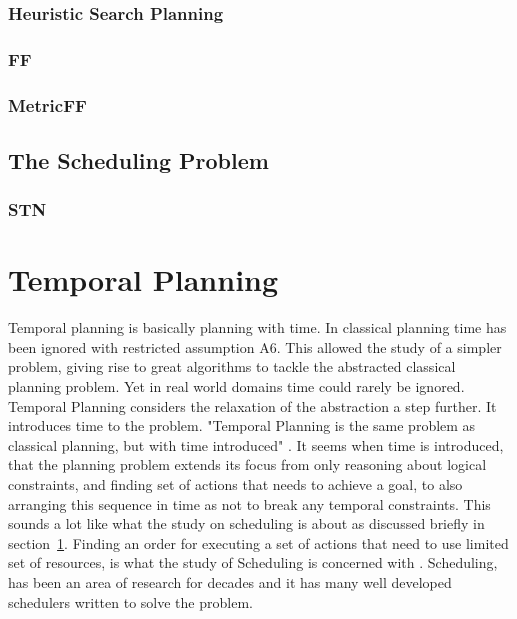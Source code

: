 \documentclass
[a4paper
,english
,parskip=half
,bibliography=totoc
]{scrreprt}
\begin{document}
        \subsection{Heuristic Search Planning}

        \subsection{FF}
        \subsection{MetricFF}

\section{The Scheduling Problem} \label{scheduling}
    \subsection{STN}

\chapter{Temporal Planning} \label{temporal_planning}
    
    Temporal planning is basically planning with time. In classical planning time has been ignored with restricted assumption A6. This allowed the study of a simpler problem, giving rise to great algorithms to tackle the abstracted classical planning problem. Yet in real world domains time could rarely be ignored. Temporal Planning considers the relaxation of the abstraction a step further. It introduces time to the problem. "Temporal Planning is the same problem as classical planning, but with time introduced" \citep{HalseyLongFox2003}.
    It seems when time is introduced, that the planning problem extends its focus from only reasoning about logical constraints, and finding set of actions that needs to achieve a goal, to also arranging this sequence in time as not to break any temporal constraints. This sounds a lot like what the study on scheduling is about as discussed briefly in section~\ref{scheduling}. Finding an order for executing a set of actions that need to use limited set of resources, is what the study of Scheduling is concerned with \citep{automated_planning}. Scheduling, has been an area of research for decades and it has many well developed schedulers written to solve the problem.
\end{document}
